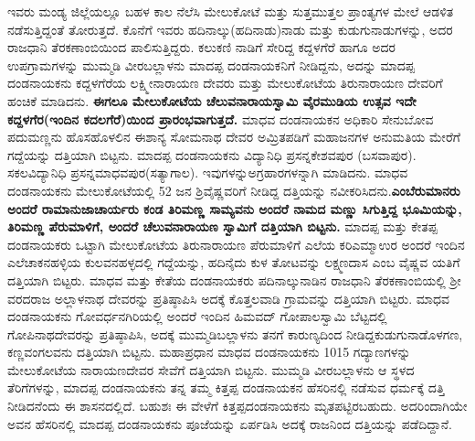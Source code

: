 ಇವರು ಮಂಡ್ಯ ಜಿಲ್ಲೆಯಲ್ಲೂ ಬಹಳ ಕಾಲ ನೆಲೆಸಿ ಮೇಲುಕೋಟೆ ಮತ್ತು ಸುತ್ತಮುತ್ತಲ ಪ್ರಾಂತ್ಯಗಳ ಮೇಲೆ ಆಡಳಿತ ನಡೆಸುತ್ತಿದ್ದಂತೆ ತೋರುತ್ತದೆ. ಕೊನೆಗೆ ಇವರು ಹದಿನಾಲ್ಕು(ಹದಿನಾಡು)ನಾಡು ಮತ್ತು ಕುಡುಗುನಾಡುಗಳನ್ನು, ಅದರ ರಾಜಧಾನಿ ತೆರಕಣಾಂಬಿಯಿಂದ ಪಾಲಿಸುತ್ತಿದ್ದರು. ಕಲುಕಣಿ ನಾಡಿಗೆ ಸೇರಿದ್ದ ಕದ್ದಳಗೆರೆ ಹಾಗೂ ಅದರ ಉಪಗ್ರಾಮಗಳನ್ನು ಮುಮ್ಮಡಿ ವೀರಬಲ್ಲಾಳನು ಮಾದಪ್ಪ ದಂಡನಾಯಕನಿಗೆ ನೀಡಿದ್ದನು, ಅದನ್ನು ಮಾದಪ್ಪ ದಂಡನಾಯಕನು ಕದ್ದಳಗೆರೆಯ ಲಕ್ಷ್ಮೀನಾರಾಯಣ ದೇವರು ಮತ್ತು ಮೇಲುಕೋಟೆಯ ತಿರುನಾರಾಯಣ ದೇವರಿಗೆ ಹಂಚಿಕೆ ಮಾಡಿದನು.\textbf{ ಈಗಲೂ ಮೇಲುಕೋಟೆಯ ಚೆಲುವನಾರಾಯಸ್ವಾಮಿ ವೈರಮುಡಿಯ ಉತ್ಸವ ಇದೇ ಕದ್ದಳಗೆರ(ಇಂದಿನ ಕದಲಗೆರೆ)ಯಿಂದ ಪ್ರಾರಂಭ\-ವಾಗುತ್ತದೆ.} ಮಾಧವ ದಂಡನಾಯಕನ ಅಧಿಕಾರಿ ಸೇನುಬೋವ ಪದುಮಣ್ಣನು ಹೊಸಹೊಳಲಿನ ಈಶಾನ್ಯ ಸೋಮನಾಥ ದೇವರ ಅಮ್ರಿತಪಡಿಗೆ ಮಹಾಜನಗಳ ಅನುಮತಿಯ ಮೇರೆಗೆ ಗದ್ದೆಯನ್ನು ದತ್ತಿಯಾಗಿ ಬಿಟ್ಟನು. ಮಾದಪ್ಪ ದಂಡನಾಯಕನು ವಿದ್ಯಾನಿಧಿ ಪ್ರಸನ್ನಕೇಶವಪುರ (ಬಸವಾಪುರ). ಸಕಲವಿದ್ಯಾನಿಧಿ ಪ್ರಸನ್ನಮಾಧವಪುರ(ಸತ್ಯಾಗಾಲ). ಇವುಗಳನ್ನು\break ಅಗ್ರಹಾರಗಳನ್ನಾಗಿ ಮಾಡಿದನು. ಮಾಧವ ದಂಡನಾಯಕನು ಮೇಲುಕೋಟೆಯಲ್ಲಿ 52 ಜನ ಶ್ರಿವೈಷ್ಣವರಿಗೆ ನೀಡಿದ್ದ ದತ್ತಿಯನ್ನು ನವೀಕರಿಸಿದನು.\textbf{ಎಂಬೆರುಮಾನರು ಅಂದರೆ ರಾಮಾನುಜಾಚಾರ್ಯರು ಕಂಡ ತಿರಿಮಣ್ಣ ಸಾಮ್ಯವನು ಅಂದರೆ ನಾಮದ ಮಣ್ಣು ಸಿಗುತ್ತಿದ್ದ ಭೂಮಿಯನ್ನು, ತಿರಿಮಣ್ಣ ಪೆರುಮಾಳಿಗೆ, ಅಂದರೆ ಚೆಲುವನಾರಾಯಣ ಸ್ವಾಮಿಗೆ ದತ್ತಿಯಾಗಿ ಬಿಟ್ಟನು.} ಮಾದಪ್ಪ ಮತ್ತು ಕೇತಪ್ಪ ದಂಡನಾಯಕರು ಒಟ್ಟಾಗಿ ಮೇಲುಕೋಟೆಯ ತಿರುನಾರಾಯಣ ಪೆರುಮಾಳಿಗೆ ಎಲೆಯ ಕರಿಎಮ್ಮಾಉರ ಅಂದರೆ ಇಂದಿನ ಎಲೆಚಾಕನಹಳ್ಳಿಯ ಕುಲವನಹಳ್ಳದಲ್ಲಿ ಗದ್ದೆಯನ್ನು, ಹದಿನೈದು ಕುಳ ತೋಟವನ್ನು ಲಕ್ಷ್ಮಣದಾಸ ಎಂಬ ವೈಷ್ಣವ ಯತಿಗೆ ದತ್ತಿಯಾಗಿ ಬಿಟ್ಟರು. ಮಾಧವ ಮತ್ತು ಕೇತೆಯ ದಂಡನಾಯಕರು ಪದಿನಾಲ್ಕುನಾಡಿನ ರಾಜಧಾನಿ ತೆರಕಣಾಂಬಿಯಲ್ಲಿ ಶ‍್ರೀ ವರದರಾಜ ಅಲ್ಲಾಳನಾಥ ದೇವರನ್ನು ಪ್ರತಿಷ್ಠಾಪಿಸಿ ಅದಕ್ಕೆ ಕೊತ್ತಲವಾಡಿ ಗ್ರಾಮವನ್ನು ದತ್ತಿಯಾಗಿ ಬಿಟ್ಟರು. ಮಾಧವ ದಂಡನಾಯಕನು ಗೋವರ್ಧನಗಿರಿಯಲ್ಲಿ ಅಂದರೆ ಇಂದಿನ ಹಿಮವದ್​ ಗೋಪಾಲಸ್ವಾಮಿ ಬೆಟ್ಟದಲ್ಲಿ ಗೋಪಿನಾಥದೇವರನ್ನು ಪ್ರತಿಷ್ಠಾಪಿಸಿ, ಅದಕ್ಕೆ ಮುಮ್ಮಡಿಬಲ್ಲಾಳನು ತನಗೆ ಕಾರುಣ್ಯದಿಂದ ನೀಡಿದ್ದ\break ಕುಡುಗುನಾಡೊಳಗಣ, ಕಣ್ಣವಂಗಲವನು ದತ್ತಿಯಾಗಿ ಬಿಟ್ಟನು. ಮಹಾಪ್ರಧಾನ ಮಾಧವ ದಂಡನಾಯಕನು 1015 ಗದ್ಯಾಣಗಳನ್ನು ಮೇಲುಕೋಟೆಯ ನಾರಾಯಣದೇವರ ಸೇವೆಗೆ ದತ್ತಿಯಾಗಿ ಬಿಟ್ಟನು. ಮುಮ್ಮಡಿ ವೀರಬಲ್ಲಾಳನು ಆ ಸ್ಥಳದ ತೆರಿಗೆಗಳನ್ನು, ಮಾದಪ್ಪ ದಂಡನಾಯಕನು ತನ್ನ ತಮ್ಮ ಕಿತ್ತಪ್ಪ ದಂಡನಾಯಕನ ಹೆಸರಿನಲ್ಲಿ ನಡೆಸುವ ಧರ್ಮಕ್ಕೆ ದತ್ತಿ ನೀಡಿದನೆಂದು ಈ ಶಾಸನದಲ್ಲಿದೆ. ಬಹುಶಃ ಈ ವೇಳೆಗೆ ಕಿತ್ತಪ್ಪದಂಡನಾಯಕನು ಮೃತಪಟ್ಟಿರಬಹುದು. ಅದರಿಂದಾಗಿಯೇ ಅವನ ಹೆಸರಿನಲ್ಲಿ ಮಾದಪ್ಪ ದಂಡನಾಯಕನು ಪೂಜೆಯನ್ನು ಏರ್ಪಡಿಸಿ ಅದಕ್ಕೆ ರಾಜನಿಂದ ದತ್ತಿಯನ್ನು ಪಡೆದಿದ್ದಾನೆ.

